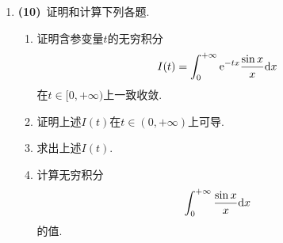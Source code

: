 \documentclass{ctexart}
\begin{document}
\begin{enumerate}[leftmargin=*,label=\textbf{\arabic*.},topsep=0pt,parsep=0pt,itemsep=0pt,partopsep=0pt]
    \item \textbf{(10)}\ 证明和计算下列各题.
        \begin{enumerate}[label=\tbf{(\arabic*)},topsep=0pt,parsep=0pt,itemsep=0pt,partopsep=0pt]
            \item 证明含参变量$t$的无穷积分
                \[I(t)=\int_0^{+\infty}\mathrm{e}^{-tx}\dfrac{\sin x}{x}\mathrm{d} x\]
                在$t\in[0,+\infty)$上一致收敛.
            \item 证明上述$I(t)$在$t\in(0,+\infty)$上可导.
            \item 求出上述$I(t)$.
            \item 计算无穷积分
                \[\int_0^{+\infty}\dfrac{\sin x}{x}\mathrm{d} x\]
                的值.
        \end{enumerate}
\end{enumerate}
\end{document}
